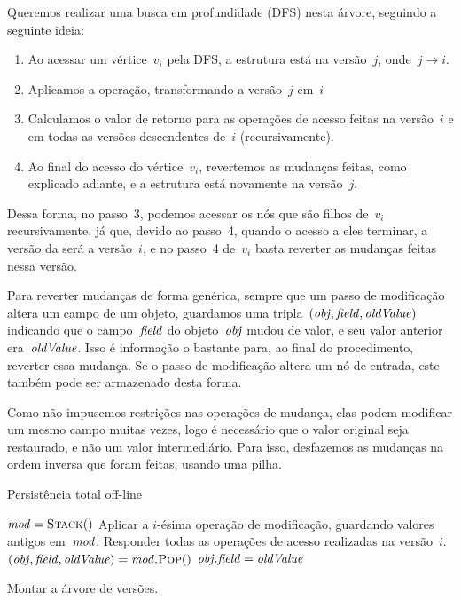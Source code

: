 \documentclass[../../main.tex]{subfiles}
\begin{document}
Queremos realizar uma busca em profundidade (DFS) nesta árvore, seguindo a seguinte ideia:
\begin{enumerate}
	\item Ao acessar um vértice~$v_i$ pela DFS, a estrutura está na versão~$j$, onde~$j \rightarrow i$.
	\item Aplicamos a operação, transformando a versão~$j$ em~$i$
	\item Calculamos o valor de retorno para as operações de acesso feitas na versão~$i$ e em todas as versões descendentes de~$i$ (recursivamente).
	\item Ao final do acesso do vértice~$v_i$, revertemos as mudanças feitas, como explicado adiante, e a estrutura está novamente na versão~$j$.
\end{enumerate}

Dessa forma, no passo~3, podemos acessar os nós que são filhos de~$v_i$ recursivamente, já que, devido ao passo~4, quando o acesso a eles terminar, a versão da será a versão~$i$, e no passo~4 de~$v_i$ basta reverter as mudanças feitas nessa versão.

Para reverter mudanças de forma genérica, sempre que um passo de modificação altera um campo de um objeto, guardamos uma tripla~$(\mathit{obj}, \mathit{field}, \mathit{oldValue})$ indicando que o campo~$\mathit{field}$ do objeto~$\mathit{obj}$ mudou de valor, e seu valor anterior era~$\mathit{oldValue}$. Isso é informação o bastante para, ao final do procedimento, reverter essa mudança. Se o passo de modificação altera um nó de entrada, este também pode ser armazenado desta forma.

Como não impusemos restrições nas operações de mudança, elas podem modificar um mesmo campo muitas vezes, logo é necessário que o valor original seja restaurado, e não um valor intermediário. Para isso, desfazemos as mudanças na ordem inversa que foram feitas, usando uma pilha.

\begin{algorithm}
\caption{Persistência total off-line} \label{lst:geraloffline}
\begin{algorithmic}[1]

	\State $\V{mod} = \Call{Stack}{\null}$
	\State Aplicar a $i$-ésima operação de modificação, guardando valores antigos em~$\mathit{mod}$.\label{line:off:opmod}
	\State Responder todas as operações de acesso realizadas na versão~$i$. \label{line:off:opac}
	 \label{line:off:for}
		\State {}
	\EndFor
	 \label{line:off:while}
		\State $(\V{obj}, \V{field}, \V{oldValue}) = \V{mod}.\Call{Pop}{\null}$
		\State $\mathit{obj}.\mathit{field} = \mathit{oldValue}$
	\EndWhile
\EndFunction

	\State Montar a árvore de versões.
	\State {}
\EndFunction

\end{algorithmic}
\end{algorithm}
\end{document}
